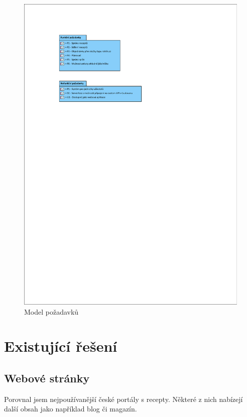 \begin{figure}[H]
    \includegraphics[width=\textwidth]{pdf/requirements}
    \caption{Model požadavků} \label{picture:recipeo:pozadavky}
\end{figure}

\newpage

\section{Existující řešení}

\subsection{Webové stránky}

Porovnal jsem nejpoužívanější české portály s recepty. Některé z nich nabízejí další obsah jako například blog či magazín.

